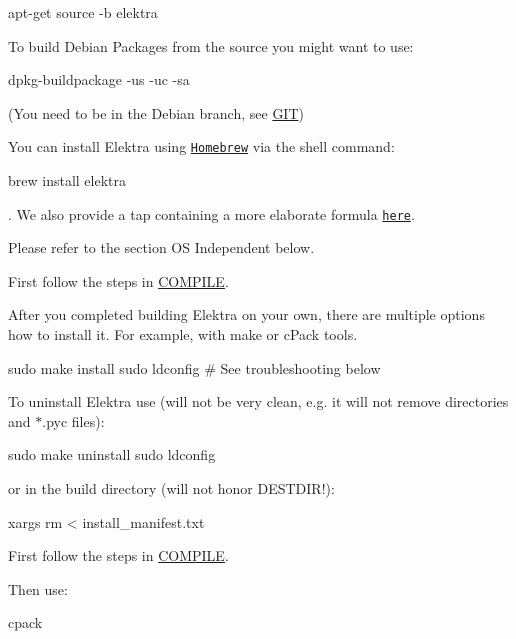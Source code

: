 \begin{DoxyCode}
apt-get source -b elektra
\end{DoxyCode}


To build Debian Packages from the source you might want to use\+:


\begin{DoxyCode}
dpkg-buildpackage -us -uc -sa
\end{DoxyCode}


(You need to be in the Debian branch, see \hyperlink{doc_GIT_md}{G\+IT})

You can install Elektra using \href{http://brew.sh}{\tt Homebrew} via the shell command\+:


\begin{DoxyCode}
brew install elektra
\end{DoxyCode}


. We also provide a tap containing a more elaborate formula \href{http://github.com/ElektraInitiative/homebrew-elektra}{\tt here}.

Please refer to the section OS Independent below.

First follow the steps in \hyperlink{doc_COMPILE_md}{C\+O\+M\+P\+I\+LE}.

After you completed building Elektra on your own, there are multiple options how to install it. For example, with make or c\+Pack tools.


\begin{DoxyCode}
sudo make install
sudo ldconfig  # See troubleshooting below
\end{DoxyCode}


To uninstall Elektra use (will not be very clean, e.\+g. it will not remove directories and {\ttfamily $\ast$.pyc} files)\+:


\begin{DoxyCode}
sudo make uninstall
sudo ldconfig
\end{DoxyCode}


or in the build directory (will not honor {\ttfamily D\+E\+S\+T\+D\+IR}!)\+:


\begin{DoxyCode}
xargs rm < install\_manifest.txt
\end{DoxyCode}


First follow the steps in \hyperlink{doc_COMPILE_md}{C\+O\+M\+P\+I\+LE}.

Then use\+:


\begin{DoxyCode}
cpack
\end{DoxyCode}


